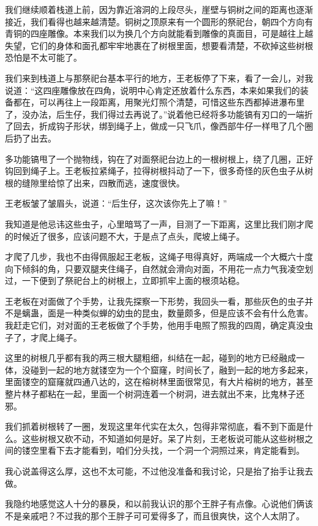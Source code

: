 我们继续顺着栈道上前，因为靠近溶洞的上段尽头，崖壁与铜树之间的距离也逐渐接近，我们看得也越来越清楚。铜树之顶原来有一个圆形的祭祀台，朝四个方向有青铜的四座雕像。本来我们以为换几个方向就能看到雕像的真面目，可是越往上越失望，它们的身体和面孔都牢牢地裹在了树根里面，想要看清楚，不砍掉这些树根恐怕是不太可能了。

我们来到栈道上与那祭祀台基本平行的地方，王老板停了下来，看了一会儿，对我说道：“这四座雕像放在四角，说明中心肯定还放着什么东西，本来如果我们的装备都在，可以再往上一段距离，用聚光灯照个清楚，可惜这些东西都掉进瀑布里了，没办法，后生仔，我们得过去再说了。”说着他已经将多功能镐有刃口的一端折了回去，折成钩子形状，绑到绳子上，做成一只飞爪，像西部牛仔一样甩了几个圈后扔了出去。

多功能镐甩了一个抛物线，钩在了对面祭祀台边上的一根树根上，绕了几圈，正好钩回到绳子上。王老板拉紧绳子，拉得树根抖动了一下，很多奇怪的灰色虫子从树根的缝隙里给惊了出来，四散而逃，速度很快。

王老板皱了皱眉头，说道：“后生仔，这次该你先上了嘛！”

我知道是他忌讳这些虫子，心里暗骂了一声，目测了一下距离，这里比我们刚才爬的时候近了很多，应该问题不大，于是点了点头，爬坡上绳子。

才爬了几步，我也不由得佩服起王老板，这绳子甩得真好，两端成一个大概六十度向下倾斜的角，只要双腿夹住绳子，自然就会滑向对面，不用花一点力气我凌空划过，一下便到了祭祀台上的树根上，立即抓牢上面的根须站稳。

王老板在对面做了个手势，让我先探察一下形势，我回头一看，那些灰色的虫子并不是螭蛊，面是一种类似蝉的幼虫的昆虫，数量颇多，但是应该不会有什么危害。我赶走它们，对对面的王老板做了个手势，他用手电照了照我的四周，确定真没虫子了，才爬上绳子。

这里的树根几乎都有我的两三根大腿粗细，纠结在一起，碰到的地方已经融成一体，没碰到一起的地方就镂空为一个个窟窿，时间长了，融到一起的地方多起来，里面镂空的窟窿就四通八达的，这在榕树林里面很常见，有大片榕树的地方，甚至整片林子都粘在一起，里面一个树洞连着一个树洞，进去就出不来，比鬼林子还邪。

我们抓着树根转了一圈，发现这里年代实在太久，包得非常彻底，看不到下面是什么。这些树根又砍不动，不知道如何是好。呆了片刻，王老板说可能从这些树根之间的镂空里看下去才能看到，咱们分头找，一个洞一个洞照过来，肯定能看到。

我心说盖得这么厚，这也不太可能，不过他没准备和我讨论，只是抬了抬手让我去做。

我隐约地感觉这人十分的暴戾，和以前我认识的那个王胖子有点像。心说他们俩该不是亲戚吧？不过我的那个王胖子可可爱得多了，而且很爽快，这个人太阴了。

